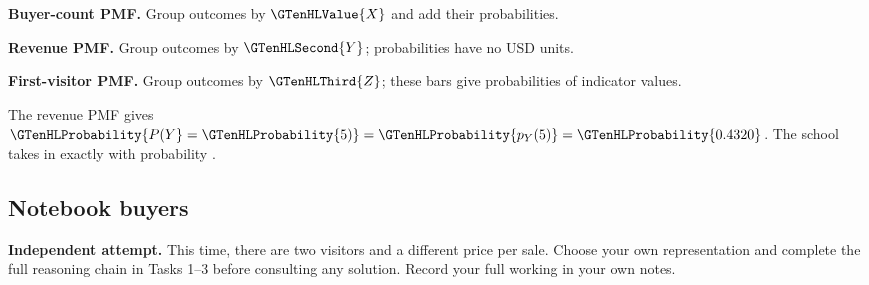 \Needspace{6.8cm}
\par\noindent \begin{minipage}[t]{.485\linewidth}
\centering
{}
\par\small \textbf{Buyer-count PMF.} Group outcomes by $\GTenHLValue{X}$ and add their probabilities.
\end{minipage}\hfill\begin{minipage}[t]{.485\linewidth}
\centering
{}
\par\small \textbf{Revenue PMF.} Group outcomes by $\GTenHLSecond{Y}$; probabilities have no USD units.
\end{minipage}\par\medskip
\Needspace{6.8cm}
\par\noindent \begin{minipage}[t]{.485\linewidth}
\centering
{}
\par\small \textbf{First-visitor PMF.} Group outcomes by $\GTenHLThird{Z}$; these bars give probabilities of indicator values.
\end{minipage}\par\medskip

The revenue PMF gives $\GTenHLProbability{P(Y}=\GTenHLProbability{5)}=\GTenHLProbability{p_{Y}(5)}=\GTenHLProbability{0.4320}$. The school takes in exactly  with probability .


\subsection{Notebook buyers}
\label{subsec:t2-c1-notebook-buyers}
\textbf{Independent attempt.} This time, there are two visitors and a different price per sale. Choose your own representation and complete the full reasoning chain in Tasks 1--3 before consulting any solution. Record your full working in your own notes.

